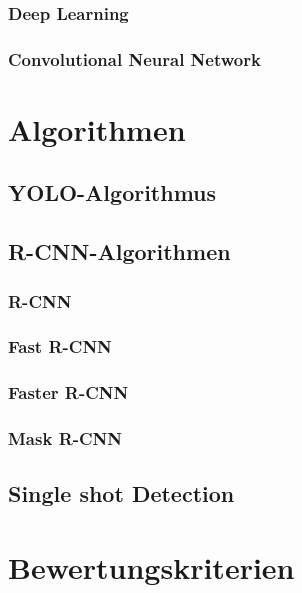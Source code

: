 \documentclass[12pt,
titlepage,
a4paper,
oneside,     %
openany,     %
listof=totoc,  %
numbers = noenddot, %
bibliography=totoc,    %
headsepline, %
]{scrbook} %
\begin{document}
\subsection{Deep Learning}
\label{subsec_deep}

\subsection{Convolutional Neural Network}
\label{subsec_cnn}


\chapter{Algorithmen}
\label{cha:algorithmen}

\section{YOLO-Algorithmus}
\label{sec_yolo}

\section{R-CNN-Algorithmen}
\label{sec_rcnnalg}

\subsection{R-CNN}
\label{subsec_rcnn}

\subsection{Fast R-CNN}
\label{subsec_frcnn}

\subsection{Faster R-CNN}
\label{subsec_ffrcnn}

\subsection{Mask R-CNN}
\label{subsec_mrcnn}

\section{Single shot Detection}
\label{sec_ssd}


\chapter{Bewertungskriterien}
\label{cha:bewertungskriterien} 
\end{document}
